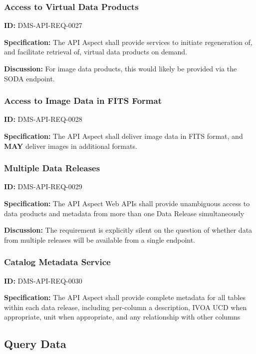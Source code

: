\documentclass[SE,toc]{lsstdoc}
\begin{document}
\subsubsection{Access to Virtual Data Products}

\label{DMS-API-REQ-0027}
\textbf{ID:} DMS-API-REQ-0027

\textbf{Specification:}
The API Aspect shall provide services to initiate regeneration of, and facilitate retrieval of, virtual data products on demand.

\textbf{Discussion:}
For image data products, this would likely be provided via the SODA endpoint.

\subsubsection{Access to Image Data in FITS Format}

\label{DMS-API-REQ-0028}
\textbf{ID:} DMS-API-REQ-0028

\textbf{Specification:}
The API Aspect shall deliver image data in FITS format, and \textbf{MAY} deliver images in additional formats.

\subsubsection{Multiple Data Releases}

\label{DMS-API-REQ-0029}
\textbf{ID:} DMS-API-REQ-0029

\textbf{Specification:}
The API Aspect Web APIs shall provide unambiguous access to data products and metadata from more than one Data Release simultaneously

\textbf{Discussion:}
The requirement is explicitly silent on the question of whether data from multiple releases will be available from a single endpoint.

\subsubsection{Catalog Metadata Service}

\label{DMS-API-REQ-0030}
\textbf{ID:} DMS-API-REQ-0030

\textbf{Specification:}
The API Aspect shall provide complete metadata for all tables within each data release, including per-column a description, IVOA UCD when appropriate, unit when appropriate, and any relationship with other columns

\subsection{Query Data}
\end{document}
